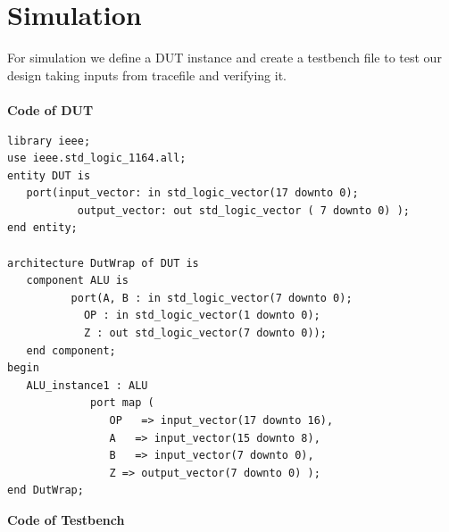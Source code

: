 \documentclass[12pt]{article}
\begin{document}
\section{Simulation}
    For simulation we define a DUT instance and create a testbench file to test our design taking inputs from tracefile and verifying it.\\\\
    \noindent
    \textbf{Code of DUT}
    \noindent
    \begin{verbatim}
library ieee;
use ieee.std_logic_1164.all;
entity DUT is
   port(input_vector: in std_logic_vector(17 downto 0);
           output_vector: out std_logic_vector ( 7 downto 0) );
end entity;

architecture DutWrap of DUT is
   component ALU is
          port(A, B : in std_logic_vector(7 downto 0);
            OP : in std_logic_vector(1 downto 0);
            Z : out std_logic_vector(7 downto 0));
   end component;
begin
   ALU_instance1 : ALU
             port map (
                OP   => input_vector(17 downto 16),
                A   => input_vector(15 downto 8),
                B   => input_vector(7 downto 0),
                Z => output_vector(7 downto 0) );
end DutWrap;
    \end{verbatim}
    \noindent
    \textbf{Code of Testbench}
    \noindent
\end{document}

